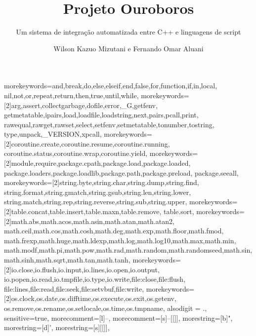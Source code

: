 \documentclass[brazil]{beamer}
\title{
  Projeto Ouroboros
}
\subtitle{
  Um sistema de integração automatizada entre C++ e
  linguagens de script
}
\author{Wilson Kazuo Mizutani e Fernando Omar Aluani}
\begin{document}
  {morekeywords={and,break,do,else,elseif,end,false,for,function,if,in,local,
     nil,not,or,repeat,return,then,true,until,while},
   morekeywords={[2]arg,assert,collectgarbage,dofile,error,_G,getfenv,
     getmetatable,ipairs,load,loadfile,loadstring,next,pairs,pcall,print,
     rawequal,rawget,rawset,select,setfenv,setmetatable,tonumber,tostring,
     type,unpack,_VERSION,xpcall},
   morekeywords={[2]coroutine.create,coroutine.resume,coroutine.running,
     coroutine.status,coroutine.wrap,coroutine.yield},
   morekeywords={[2]module,require,package.cpath,package.load,package.loaded,
     package.loaders,package.loadlib,package.path,package.preload,
     package.seeall},
   morekeywords={[2]string.byte,string.char,string.dump,string.find,
     string.format,string.gmatch,string.gsub,string.len,string.lower,
     string.match,string.rep,string.reverse,string.sub,string.upper},
   morekeywords={[2]table.concat,table.insert,table.maxn,table.remove,
   table.sort},
   morekeywords={[2]math.abs,math.acos,math.asin,math.atan,math.atan2,
     math.ceil,math.cos,math.cosh,math.deg,math.exp,math.floor,math.fmod,
     math.frexp,math.huge,math.ldexp,math.log,math.log10,math.max,math.min,
     math.modf,math.pi,math.pow,math.rad,math.random,math.randomseed,math.sin,
     math.sinh,math.sqrt,math.tan,math.tanh},
   morekeywords={[2]io.close,io.flush,io.input,io.lines,io.open,io.output,
     io.popen,io.read,io.tmpfile,io.type,io.write,file:close,file:flush,
     file:lines,file:read,file:seek,file:setvbuf,file:write},
   morekeywords={[2]os.clock,os.date,os.difftime,os.execute,os.exit,os.getenv,
     os.remove,os.rename,os.setlocale,os.time,os.tmpname},
   alsodigit = {.},
   sensitive=true,
   morecomment=[l]{--},
   morecomment=[s]{--[[}{]]},
   morestring=[b]",
   morestring=[d]',
   morestring=[s]{[[}{]]},
  }
\end{document}
